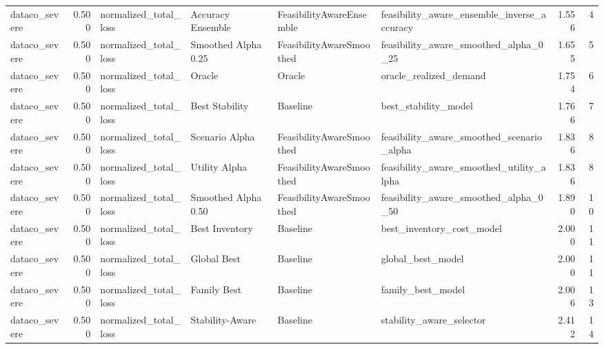 \begin{table}
{\begin{tabular}{lrllllrr}
 dataco\_severe &             0.500 &       normalized\_total\_loss &     Accuracy Ensemble &  FeasibilityAwareEnsemble &        feasibility\_aware\_ensemble\_inverse\_accuracy &         1.556 &               4 \\
 dataco\_severe &             0.500 &       normalized\_total\_loss &   Smoothed Alpha 0.25 &  FeasibilityAwareSmoothed &              feasibility\_aware\_smoothed\_alpha\_0\_25 &         1.655 &               5 \\
 dataco\_severe &             0.500 &       normalized\_total\_loss &                Oracle &                    Oracle &                             oracle\_realized\_demand &         1.754 &               6 \\
 dataco\_severe &             0.500 &       normalized\_total\_loss &        Best Stability &                  Baseline &                               best\_stability\_model &         1.766 &               7 \\
 dataco\_severe &             0.500 &       normalized\_total\_loss &        Scenario Alpha &  FeasibilityAwareSmoothed &          feasibility\_aware\_smoothed\_scenario\_alpha &         1.836 &               8 \\
 dataco\_severe &             0.500 &       normalized\_total\_loss &         Utility Alpha &  FeasibilityAwareSmoothed &           feasibility\_aware\_smoothed\_utility\_alpha &         1.836 &               8 \\
 dataco\_severe &             0.500 &       normalized\_total\_loss &   Smoothed Alpha 0.50 &  FeasibilityAwareSmoothed &              feasibility\_aware\_smoothed\_alpha\_0\_50 &         1.890 &              10 \\
 dataco\_severe &             0.500 &       normalized\_total\_loss &        Best Inventory &                  Baseline &                          best\_inventory\_cost\_model &         2.000 &              11 \\
 dataco\_severe &             0.500 &       normalized\_total\_loss &           Global Best &                  Baseline &                                  global\_best\_model &         2.000 &              11 \\
 dataco\_severe &             0.500 &       normalized\_total\_loss &           Family Best &                  Baseline &                                  family\_best\_model &         2.006 &              13 \\
 dataco\_severe &             0.500 &       normalized\_total\_loss &       Stability-Aware &                  Baseline &                           stability\_aware\_selector &         2.412 &              14 \\

\end{tabular}}
\end{table}
